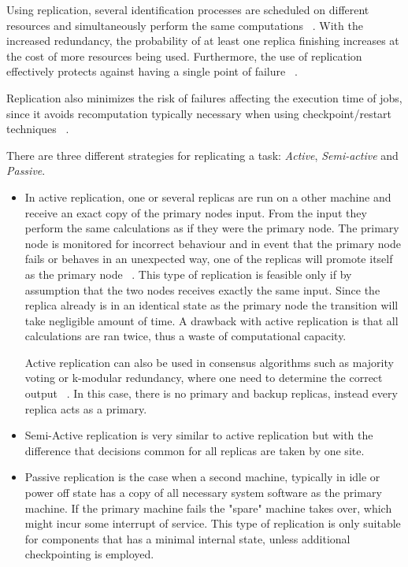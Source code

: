 \documentclass{cslthse-msc}
\begin{document}
Using replication, several identification processes are scheduled on different resources and simultaneously perform the same computations ~\cite{relGridSystems}. With the increased redundancy, the probability of at least one replica finishing increases at the cost of more resources being used. Furthermore, the use of replication effectively protects against having a single point of failure ~\cite{faultToleranceGrid}.

Replication also minimizes the risk of failures affecting the execution time of jobs, since it avoids recomputation typically necessary when using checkpoint/restart techniques ~\cite{designFaultTolerantSched}.

There are three different strategies for replicating a task: \emph{Active}, \emph{Semi-active} and \emph{Passive}.
\begin{itemize}

\item In active replication, one or several replicas are run on a other machine and receive an exact copy of the primary nodes input. From the input they perform the same calculations as if they were the primary node. The primary node is monitored for incorrect behaviour and in event that the primary node fails or behaves in an unexpected way, one of the replicas will promote itself as the primary node ~\cite{surveyFaultParallel}. This type of replication is feasible only if by assumption that the two nodes receives exactly the same input. Since the replica already is in an identical state as the primary node the transition will take negligible amount of time. A drawback with active replication is that all calculations are ran twice, thus a waste of computational capacity. 

Active replication can also be used in consensus algorithms such as majority voting or k-modular redundancy, where one need to determine the correct output ~\cite{surveyFaultParallel}. In this case, there is no primary and backup replicas, instead every replica acts as a primary.

\item Semi-Active replication is very similar to active replication but with the difference that decisions common for all replicas are taken by one site.

\item Passive replication is the case when a second machine, typically in idle or power off state has a copy of all necessary system software as the primary machine. If the primary machine fails the "spare" machine takes over, which might incur some interrupt of service. This type of replication is only suitable for components that has a minimal internal state, unless additional checkpointing is employed.
\end{itemize}
\end{document}
